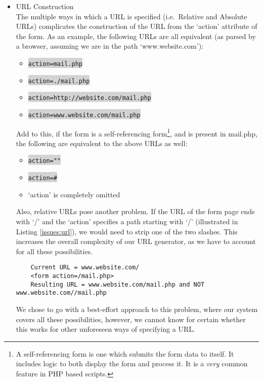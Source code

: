 \begin{itemize}
	\item URL Construction\\
	The multiple ways in which a URL is specified (i.e.\ Relative and Absolute URLs) complicates the construction of the URL from the `action' attribute of the form.  As an example, the following URLs are all equivalent (as parsed by a browser, assuming we are in the path `www.website.com'):
	
	\begin{itemize}
		\item \colorbox{lightgray}{\lstinline{action=mail.php}}
		\item \colorbox{lightgray}{\lstinline{action=./mail.php}}
		\item \colorbox{lightgray}{\lstinline{action=http://website.com/mail.php}}
		\item \colorbox{lightgray}{\lstinline{action=www.website.com/mail.php}}
	\end{itemize}
	Add to this, if the form is a self-referencing form\footnote{A self-referencing form is one which submits the form data to itself. It includes logic to both display the form and process it. It is a \emph{very} common feature in PHP based scripts.}, and is present in mail.php, the following are equivalent to the above URLs as well:
	\begin{itemize}
		\item \colorbox{lightgray}{\lstinline{action=""}}
		\item \colorbox{lightgray}{\lstinline{action=#}}
		\item `action' is completely omitted
	\end{itemize}
	Also, relative URLs pose another problem. If the URL of the form page ends with `/' and the `action' specifies a path starting with `/' (illustrated in Listing \ref{issues:url}), we would need to strip one of the two slashes. This increases the overall complexity of our URL generator, as we have to account for all these possibilities.
		
	\begin{lstlisting}
	Current URL = www.website.com/
	<form action=/mail.php>
	Resulting URL = www.website.com/mail.php and NOT www.website.com//mail.php
	\end{lstlisting}
	
	We chose to go with a best-effort approach to this problem, where our system covers all these possibilities, however, we cannot know for certain whether this works for other unforeseen ways of specifying a URL.
	

\end{itemize}

